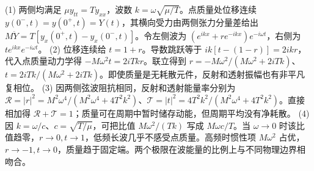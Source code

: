 (1) 两侧均满足 \(\mu y_{tt}=Ty_{xx}\)，波数 \(k=\omega\sqrt{\mu/T}\)。点质量处位移连续 \(y(0^-,t)=y(0^+,t)=Y(t)\)，其横向受力由两侧张力分量差给出 \(M\ddot Y=T[y_x(0^+,t)-y_x(0^-,t)]\)。令左侧波为 \((e^{ikx}+r e^{-ikx})e^{-i\omega t}\)，右侧为 \(t e^{ikx}e^{-i\omega t}\)。
(2) 位移连续给 \(t=1+r\)。导数跳跃等于 \(ik[t-(1-r)]=2ikr\)，代入点质量动力学得 \(-M\omega^2t=2iTk r\)。联立得到 \(r=-M\omega^2/(M\omega^2+2iTk)\)、\(t=2iTk/(M\omega^2+2iTk)\)。即使质量是无耗散元件，反射和透射振幅也有非平凡复相位。
(3) 因两侧弦波阻抗相同，反射和透射能量率分别为 \(\mathcal R=|r|^2=M^2\omega^4/(M^2\omega^4+4T^2k^2)\)、\(\mathcal T=|t|^2=4T^2k^2/(M^2\omega^4+4T^2k^2)\)。直接相加得 \(\mathcal R+\mathcal T=1\)；质量可在周期中暂时储存动能，但周期平均没有净耗散。
(4) 因 \(k=\omega/c\)、\(c=\sqrt{T/\mu}\)，可把比值 \(M\omega^2/(Tk)\) 写成 \(M\omega c/T\)。当 \(\omega\to0\) 时该比值趋零，\(r\to0,t\to1\)，低频长波几乎不感受点质量。高频时惯性项 \(M\omega^2\) 占优，\(r\to-1,t\to0\)，质量趋于固定端。两个极限在波能量的比例上与不同物理边界相吻合。
